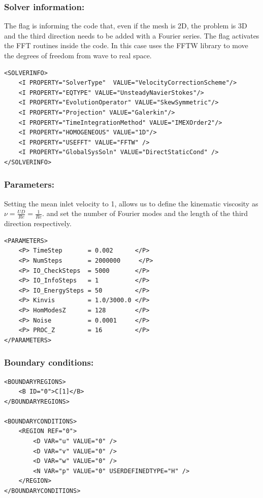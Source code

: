 \subsubsection{Solver information:~} The flag  is informing the code that, even if the mesh is 2D, the problem is 3D and the third direction needs to be added with a Fourier series. The flag  activates the FFT routines inside the code. In this case \nekpp uses the FFTW library to move the degrees of freedom from wave to real space. 

\begin{lstlisting}[style=XMLStyle]
<SOLVERINFO>
	<I PROPERTY="SolverType"  VALUE="VelocityCorrectionScheme"/>
	<I PROPERTY="EQTYPE" VALUE="UnsteadyNavierStokes"/>
	<I PROPERTY="EvolutionOperator" VALUE="SkewSymmetric"/>
	<I PROPERTY="Projection" VALUE="Galerkin"/>
	<I PROPERTY="TimeIntegrationMethod" VALUE="IMEXOrder2"/>
	<I PROPERTY="HOMOGENEOUS" VALUE="1D"/>
	<I PROPERTY="USEFFT" VALUE="FFTW" />
	<I PROPERTY="GlobalSysSoln" VALUE="DirectStaticCond" />
</SOLVERINFO>
\end{lstlisting}

\subsubsection{Parameters:~} Setting the mean inlet velocity to 1, allows us to define the kinematic viscosity as $\nu = \frac{UD}{Re}=\frac{1}{Re}$.  and  set the number of Fourier modes and the length of the third direction respectively. 

\begin{lstlisting}[style=XMLStyle]
<PARAMETERS>
	<P> TimeStep       = 0.002      </P>
	<P> NumSteps       = 2000000     </P>
	<P> IO_CheckSteps  = 5000       </P>
	<P> IO_InfoSteps   = 1          </P>
	<P> IO_EnergySteps = 50         </P>
	<P> Kinvis         = 1.0/3000.0 </P>
	<P> HomModesZ      = 128        </P>
	<P> Noise          = 0.0001     </P>
	<P> PROC_Z         = 16         </P>
</PARAMETERS>
\end{lstlisting}

\subsubsection{Boundary conditions:~} 
\begin{lstlisting}[style=XMLStyle]
<BOUNDARYREGIONS>
	<B ID="0">C[1]</B>
</BOUNDARYREGIONS>

<BOUNDARYCONDITIONS>
	<REGION REF="0">
		<D VAR="u" VALUE="0" />
        <D VAR="v" VALUE="0" />
        <D VAR="w" VALUE="0" />
        <N VAR="p" VALUE="0" USERDEFINEDTYPE="H" />
	</REGION>
</BOUNDARYCONDITIONS>
\end{lstlisting}

